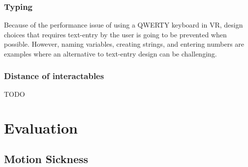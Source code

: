 \documentclass{sigchi}
\begin{document}
\subsubsection{Typing}
Because of the performance issue of using a QWERTY keyboard in VR, design choices that requires text-entry by the user is going to be prevented when possible. However, naming variables, creating strings, and entering numbers are examples where an alternative to text-entry design can be challenging.

\subsubsection{Distance of interactables}
TODO

\section{Evaluation}
\subsection{Motion Sickness}



\end{document}
